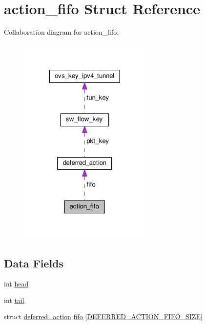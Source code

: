 \hypertarget{structaction__fifo}{}\section{action\+\_\+fifo Struct Reference}
\label{structaction__fifo}


Collaboration diagram for action\+\_\+fifo\+:
\nopagebreak
\begin{figure}[H]
\begin{center}
\leavevmode
\includegraphics[width=188pt]{structaction__fifo__coll__graph}
\end{center}
\end{figure}
\subsection*{Data Fields}
\begin{DoxyCompactItemize}
\item 
int \hyperlink{structaction__fifo_a5376b4a5c9dbfd84303d156a47ed9018}{head}
\item 
int \hyperlink{structaction__fifo_a60805cbdf935d6718f685c7374ae9493}{tail}
\item 
struct \hyperlink{structdeferred__action}{deferred\+\_\+action} \hyperlink{structaction__fifo_ab25b47c1bc05f5417f0a2073a47b2eb5}{fifo} \mbox{[}\hyperlink{linux_2actions_8c_acb72e0b273dae399e2619f619fd061ed}{D\+E\+F\+E\+R\+R\+E\+D\+\_\+\+A\+C\+T\+I\+O\+N\+\_\+\+F\+I\+F\+O\+\_\+\+S\+I\+Z\+E}\mbox{]}
\end{DoxyCompactItemize}


